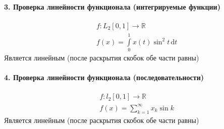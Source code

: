 \documentclass{article}[12pt]
\renewcommand{\d}{\,\mathrm{d}}
\newcommand{\R}{\mathbb{R}}
\begin{document}
\paragraph{3. Проверка линейности функционала (интегрируемые функции)}
\begin{eqnarray*}
    &&f:L_{2}[0,1]\to\R\\
    &&f(x)=\int\limits_{0}^{1}x(t)\sin^{2}t\d{t}
\end{eqnarray*}
Является линейным (после раскрытия скобок обе части равны)

\paragraph{4. Проверка линейности функционала (последовательности)}
\begin{eqnarray*}
    &&f:l_{2}[0,1]\to\R\\
    &&f(x)=\sum\limits_{k=1}^{\infty}x_{k}\sin{k}
\end{eqnarray*}
Является линейным (после раскрытия скобок обе части равны)
\end{document}
